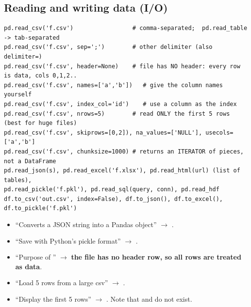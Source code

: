 \subsection{Reading and writing data (I/O)}
\begin{codebox}
\begin{Verbatim}
pd.read_csv('f.csv')                 # comma-separated;  pd.read_table -> tab-separated
pd.read_csv('f.csv', sep=';')        # other delimiter (also delimiter=)
pd.read_csv('f.csv', header=None)    # file has NO header: every row is data, cols 0,1,2..
pd.read_csv('f.csv', names=['a','b'])   # give the column names yourself
pd.read_csv('f.csv', index_col='id')    # use a column as the index
pd.read_csv('f.csv', nrows=5)        # read ONLY the first 5 rows  (best for huge files)
pd.read_csv('f.csv', skiprows=[0,2]), na_values=['NULL'], usecols=['a','b']
pd.read_csv('f.csv', chunksize=1000) # returns an ITERATOR of pieces, not a DataFrame
pd.read_json(s), pd.read_excel('f.xlsx'), pd.read_html(url) (list of tables),
pd.read_pickle('f.pkl'), pd.read_sql(query, conn), pd.read_hdf
df.to_csv('out.csv', index=False), df.to_json(), df.to_excel(), df.to_pickle('f.pkl')
\end{Verbatim}
\end{codebox}
\begin{exam}
\begin{itemize}
  \item ``Converts a JSON string into a Pandas object'' $\to$ .
  \item ``Save with Python's pickle format'' $\to$ .
  \item ``Purpose of '' $\to$ \textbf{the file has no header row, so all rows are treated as data}.
  \item ``Load 5 rows from a large csv'' $\to$ .
  \item ``Display the first 5 rows'' $\to$ . Note that  and  do not exist.
\end{itemize}
\end{exam}

